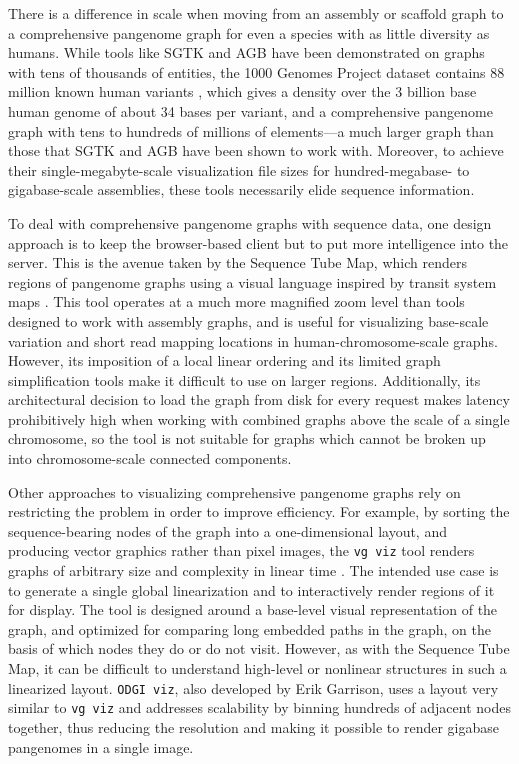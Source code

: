 There is a difference in scale when moving from an assembly or scaffold graph to a comprehensive pangenome graph for even a species with as little diversity as humans.
While tools like SGTK and AGB have been demonstrated on graphs with tens of thousands of entities, the 1000 Genomes Project dataset contains 88 million known human variants \citep{1000_2015}, which gives a density over the 3 billion base human genome of about 34 bases per variant, and a comprehensive pangenome graph with tens to hundreds of millions of elements---a much larger graph than those that SGTK and AGB have been shown to work with.
Moreover, to achieve their single-megabyte-scale visualization file sizes for hundred-megabase- to gigabase-scale assemblies, these tools necessarily elide sequence information.

To deal with comprehensive pangenome graphs with sequence data, one design approach is to keep the browser-based client but to put more intelligence into the server.
This is the avenue taken by the Sequence Tube Map, which renders regions of pangenome graphs using a visual language inspired by transit system maps \citep{Beyer_2019}.
This tool operates at a much more magnified zoom level than tools designed to work with assembly graphs, and is useful for visualizing base-scale variation and short read mapping locations in human-chromosome-scale graphs.
However, its imposition of a local linear ordering and its limited graph simplification tools make it difficult to use on larger regions.
Additionally, its architectural decision to load the graph from disk for every request makes latency prohibitively high when working with combined graphs above the scale of a single chromosome, so the tool is not suitable for graphs which cannot be broken up into chromosome-scale connected components. 

Other approaches to visualizing comprehensive pangenome graphs rely on restricting the problem in order to improve efficiency.
For example, by sorting the sequence-bearing nodes of the graph into a one-dimensional layout, and producing vector graphics rather than pixel images, the \texttt{vg viz} tool renders graphs of arbitrary size and complexity in linear time \citep{Garrison_2019}. 
The intended use case is to generate a single global linearization and to interactively render regions of it for display.
The tool is designed around a base-level visual representation of the graph, and optimized for comparing long embedded paths in the graph, on the basis of which nodes they do or do not visit. 
However, as with the Sequence Tube Map, it can be difficult to understand high-level or nonlinear structures in such a linearized layout. 
\texttt{ODGI viz}, also developed by Erik Garrison, uses a layout very similar to \texttt{vg viz} and addresses scalability by binning hundreds of adjacent nodes together, thus reducing the resolution and making it possible to render gigabase pangenomes in a single image.

